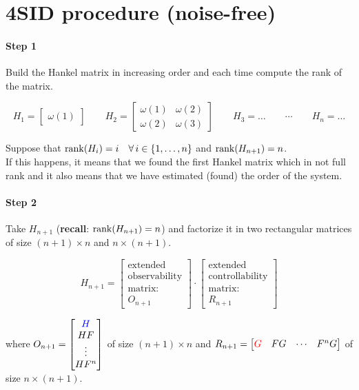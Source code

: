 \section{4SID procedure (noise-free)} \label{sec:4SID-NF}

\paragraph{Step 1} \label{4SID-NF:step1} Build the Hankel matrix in increasing order and each time compute the rank of the matrix.

\[
    H_1 = \begin{bmatrix}
        \omega(1)
    \end{bmatrix}
    \qquad
    H_2 = \begin{bmatrix}
        \omega(1) & \omega(2) \\
        \omega(2) & \omega(3)
    \end{bmatrix}
    \qquad
    H_3 = \ldots
    \qquad
    \cdots
    \qquad
    H_n = \ldots
\]

Suppose that $\rank (H_i) = i \quad \forall i \in \{1, \dots, n\}$ \quad and $\operatorname*{rank} (H_{n+1}) = n$.\\
If this happens, it means that we found the first Hankel matrix which in not full rank and it also means that we have estimated (found) the order of the system.

\paragraph{Step 2} Take $H_{n+1}$ (\textbf{recall}: $\operatorname*{rank} (H_{n+1}) = n$) and factorize it in two rectangular matrices of size $(n+1) \times n$ and $n \times (n+1)$.

\[
    H_{n+1} = \begin{bmatrix}
        \text{extended} \\
        \text{observability} \\
        \text{matrix:} \\
        O_{n+1}
    \end{bmatrix} \cdot \begin{bmatrix}
        \text{extended} \\
        \text{controllability} \\
        \text{matrix:} \\
        R_{n+1}
    \end{bmatrix}
\]

where $O_{n+1} = \begin{bmatrix}
    \color{blue}H \\ HF \\ \vdots \\ HF^n
\end{bmatrix}$ of size $(n+1)\times n$ and $R_{n+1} = \begin{bmatrix}
    \color{red}G & FG & \cdots & F^nG
\end{bmatrix}$ of size $n\times (n+1)$.

